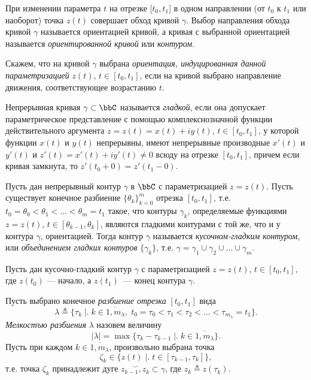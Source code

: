 При изменении параметра $t$ на отрезке $[t_0 , t_1$] в одном направлении (от $t_0$ к $t_1$ или наоборот) точка $z(t)$ совершает обход кривой $\gamma$. Выбор направления обхода кривой $\gamma$ называется ориентацией кривой, а кривая с выбранной ориентацией называется \textit{ориентированной кривой} или \textit{контуром}.

Скажем, что на кривой $\gamma$ выбрана \textit{ориентация, индуцированная данной параметризацией} $z(t)$, $t \in[t_0 , t_1]$, если на кривой выбрано направление движения, соответствующее возрастанию $t$. 

\begin{defn}
Непрерывная кривая $\gamma \subset \bbC$ называется \textit{гладкой}, если она допускает параметрическое представление с помощью комплекснозначной функции действительного аргумента $z = z(t) = x(t) + iy(t)$, $t \in [t_0 , t_1]$, у которой функции $x(t)$ и $y(t)$ непрерывны, имеют непрерывные производные $x'(t)$ и $y'(t)$ и $z'(t) = x'(t) +iy'(t) \ne 0$ всюду на отрезке $[t_0 , t_1]$, причем если кривая замкнута, то $z'(t_0 +0)= z'(t_1 - 0)$.
\end{defn}

\begin{defn}
Пусть дан непрерывный контур $\gamma$ в $\bbC$ с параметризацией $z =z(t)$. Пусть существует конечное разбиение $\{\theta_k\}^m_{k=0}$ отрезка $[t_0 , t_1]$, т.е. $t_0 = \theta_0 < \theta_1 < ... < \theta_m = t_1$ такое, что контуры $\gamma_k$, определяемые функциями $z = z(t)$, $t \in [\theta_{k-1}, \theta_k]$, являются гладкими контурами с той же, что и у контура $\gamma$, ориентацией. Тогда контур $\gamma$ называется \textit{кусочном-гладким контуром}, или \textit{объединением гладких контуров } $\{\gamma_k\}$, т.е. $\gamma = \gamma_1 \cup \gamma_2 \cup\dots \cup\gamma_m$. 
\end{defn}


Пусть дан кусочно-гладкий контур $\gamma$ с параметризацией $z=z(t)$, $t \in[t_0 , t_1]$, где $z(t_0)$ --- начало, а $z(t_1)$~--- конец контура $\gamma$. 

Пусть выбрано конечное \textit{разбиение отрезка} $[t_0, t_1]$ вида
\begin{equation}
\label{exp19}
\lambda \triangleq \{\tau_k\; \bigr|\bigl.\; k \in \overline{1,m_\lambda},\; t_0=\tau_0 < \tau_1 < \tau_2 < \dots < \tau_{m_\lambda} = t_1 \}.
\end{equation}
\textit{Мелкостъю разбиения} $\lambda$ назовем величину
$$
|\lambda| = \max \{\tau_k - \tau_{k-1} \; \bigr|\bigl.\; k \in \overline{1,m_\lambda}\}.
$$
Пусть при каждом $k \in \overline{1,m_\lambda}$, произвольно выбрана точка
\begin{equation}
\label{exp23}
\zeta_k \in \{z(t)\; \bigr|\bigl.\; t \in [\tau_{k-1},\tau_k]\},
\end{equation}
т.е. точка $\zeta_k$ принадлежит дуге $\stackrel{\smile}{z_{k-1}, z_k} \subset \gamma$, где $z_k \triangleq z(\tau_k)$.

